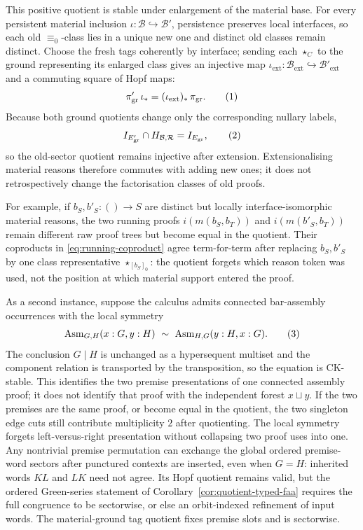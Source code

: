 \documentclass[10pt,a4paper]{article}
\theoremstyle{plain}
\theoremstyle{definition}
\theoremstyle{remark}
\newcommand{\Base}{\mathcal B}
\newcommand{\Rules}{\mathcal R}
\newcommand{\fjoin}{\mathbin{\sqcup}}
\newcommand{\eqtag}{\refstepcounter{equation}\tag{\theequation}}
\begin{document}
This positive quotient is stable under enlargement of the material base.
For every persistent material inclusion
\(\iota:\Base\hookrightarrow\Base'\), persistence preserves local interfaces,
so each old \(\equiv_0\)-class lies in a unique new one and distinct old
classes remain distinct.  Choose the fresh tags coherently by interface;
sending each \(\star_C\) to the ground representing its enlarged class gives an
injective map
\(
\iota_{\mathrm{ext}}:\Base_{\mathrm{ext}}
 \hookrightarrow\Base'_{\mathrm{ext}}
\)
and a commuting square of Hopf maps:
\[
 \pi'_{\mathrm{gr}}\,\iota_*
   = (\iota_{\mathrm{ext}})_*\,\pi_{\mathrm{gr}}.
\eqtag\label{eq:ground-extensionalisation-naturality}
\]
Because both ground quotients change only the corresponding nullary labels,
\[
 I_{E_{\mathrm{gr}}'}\cap H_{\Base,\Rules}
    =I_{E_{\mathrm{gr}}},
\eqtag\label{eq:ground-proof-irrelevance-conservativity}
\]
so the old-sector quotient remains injective after extension.
Extensionalising material reasons therefore commutes with adding new ones; it
does not retrospectively change the factorisation classes of old proofs.

For example, if \(b_S,b'_S:()\to S\) are distinct but
locally interface-isomorphic material reasons, the two
running proofs
\(
i(m(b_S,b_T))
\)
and
\(
i(m(b'_S,b_T))
\)
remain different raw proof trees but become equal in the quotient.  Their
coproducts in \eqref{eq:running-coproduct} agree term-for-term after replacing
\(b_S,b'_S\) by one class representative \(\star_{[b_S]_0}\): the quotient
forgets which reason token was used, not the position at which material
support entered the proof.

As a second instance, suppose the calculus admits connected bar-assembly
occurrences with the local symmetry
\[
 \operatorname{Asm}_{G,H}(x:G,y:H)
 \ \sim\
 \operatorname{Asm}_{H,G}(y:H,x:G).
\eqtag\label{eq:symmetric-assembly-congruence}
\]
The conclusion \(G\mid H\) is unchanged as a hypersequent multiset and the
component relation is transported by the transposition, so the equation is
CK-stable.  This identifies the two premise presentations of one connected
assembly proof; it does not identify that proof with the independent forest
\(x\fjoin y\).  If the two premises are the same proof, or become equal in
the quotient, the two singleton edge cuts still contribute multiplicity
\(2\) after quotienting.  The local symmetry
forgets left-versus-right presentation without collapsing two proof uses into
one.  Any nontrivial premise permutation can exchange the global ordered
premise-word sectors after punctured contexts are inserted, even when \(G=H\):
inherited words \(KL\) and \(LK\) need not agree.  Its Hopf quotient remains
valid, but the ordered Green-series statement of
Corollary~\ref{cor:quotient-typed-faa} requires the full congruence to be
sectorwise, or else an orbit-indexed refinement of input words.  The
material-ground tag quotient fixes premise slots and is sectorwise.
\end{document}
